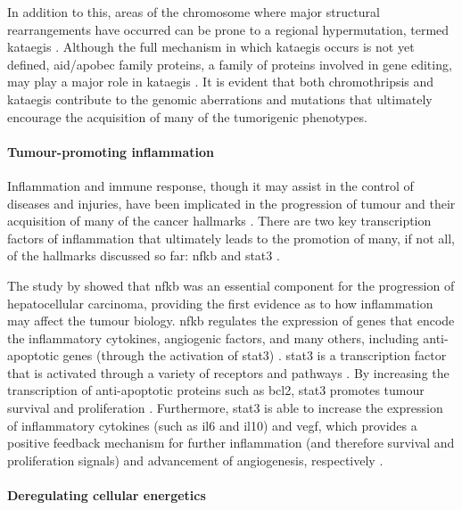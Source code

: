 In addition to this, areas of the chromosome where major structural rearrangements have occurred can be prone to a regional hypermutation, termed \gls{kataegis} \citep{Leibowitz2015,Nik-Zainal2012}.
Although the full mechanism in which \gls{kataegis} occurs is not yet defined, \gls{aid}/\acrshort{apobec} family proteins, a family of proteins involved in gene editing, may play a major role in \gls{kataegis} \citep{Leibowitz2015,Nik-Zainal2012}.
It is evident that both \gls{chromothripsis} and \gls{kataegis} contribute to the genomic aberrations and mutations that ultimately encourage the acquisition of many of the tumorigenic phenotypes.

\paragraph{Tumour-promoting inflammation}

\noindent
Inflammation and immune response, though it may assist in the control of diseases and injuries, have been implicated in the progression of tumour and their acquisition of many of the cancer hallmarks \citep{Hanahan2011}.
There are two key transcription factors of inflammation that ultimately leads to the promotion  of many, if not all, of the hallmarks discussed so far: \gls{nfkb} and \gls{stat3} \citep{Mantovani2008}.

The study by \citep{Pikarsky2004} showed that \gls{nfkb} was an essential component for the progression of hepatocellular carcinoma, providing the first evidence as to how inflammation may affect the tumour biology.
\gls{nfkb} regulates the expression of genes that encode the inflammatory cytokines, angiogenic factors, and many others, including anti-apoptotic genes (through the activation of \gls{stat3}) \citep{Elinav2013,Mantovani2008}.
\gls{stat3} is a transcription factor that is activated through a variety of receptors and pathways \citep{Yu2007,Yu2014}.
By increasing the transcription of anti-apoptotic proteins such as \gls{bcl2}, \gls{stat3} promotes tumour survival and proliferation \citep{Yu2007}.
Furthermore, \gls{stat3} is able to increase the expression of inflammatory cytokines (such as \gls{il6} and \acrshort{il10}) and \acrshort{vegf}, which provides a positive feedback mechanism for further inflammation (and therefore survival and proliferation signals) and advancement of angiogenesis, respectively \citep{Yu2007}.

\paragraph{Deregulating cellular energetics}

